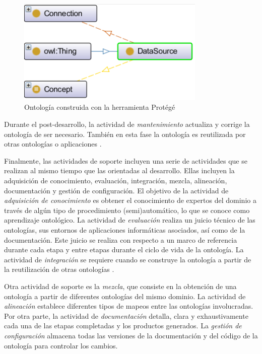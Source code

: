 \begin{figure}
\begin{center}
	\includegraphics[width=0.8\textwidth]{img/ontologiaProtege.png}
\end{center}
\caption{Ontología construida con la herramienta Protégé}
\label{fig: ontologiaProtege}
\end{figure}

Durante el post-desarrollo, la actividad de \textit{mantenimiento} actualiza y corrige la ontología de ser necesario. También en esta fase la ontología es reutilizada por otras ontologías o aplicaciones \citep{Gomez-Perez:2007:OEE:1199560}.

Finalmente, las actividades de soporte incluyen una serie de actividades que se realizan al mismo tiempo que las orientadas al desarrollo. Ellas incluyen la adquisición de conocimiento, evaluación, integración, mezcla, alineación, documentación y gestión de configuración. El objetivo de la actividad de \textit{adquisición de conocimiento} es obtener el conocimiento de expertos del dominio a través de algún tipo de procedimiento (semi)automático, lo que se conoce como aprendizaje ontológico. La actividad de \textit{evaluación} realiza un juicio técnico de las ontologías, sus entornos de aplicaciones informáticas asociados, así como de la documentación. Este juicio se realiza con respecto a un marco de referencia durante cada etapa y entre etapas durante el ciclo de vida de la ontología. La actividad de \textit{integración} se requiere cuando se construye la ontología a partir de la reutilización de otras ontologías \citep{Gomez-Perez:2007:OEE:1199560}.

Otra actividad de soporte es la \textit{mezcla}, que consiste en la obtención de una ontología a partir de diferentes ontologías del mismo dominio. La actividad de \textit{alineación} establece diferentes tipos de mapeos entre las ontologías  involucradas. Por otra parte, la actividad de \textit{documentación} detalla, clara y exhaustivamente cada una de las etapas completadas y los productos generados. La \textit{gestión de configuración} almacena todas las versiones de la documentación y del código de la ontología para controlar los cambios.

